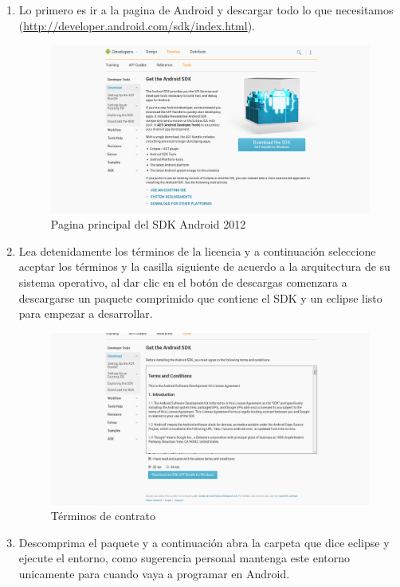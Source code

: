 \documentclass[11pt]{book}
\begin{document}
\begin{enumerate}[1.]

\item Lo primero es ir a la pagina de Android y descargar todo lo que necesitamos (\href{http://developer.android.com/sdk/index.html}{http://developer.android.com/sdk/index.html}).

\begin{figure}[H]
  \centering
    \includegraphics[width=1.0\textwidth]{tutorial_3}
  \caption{Pagina principal del SDK Android 2012}
  \label{fig:tutorial_3}
\end{figure}
\newpage
\item Lea detenidamente los términos de la licencia y a continuación seleccione aceptar los términos y la casilla siguiente de acuerdo a la arquitectura de su sistema operativo, al dar clic en el botón de descargas comenzara a descargarse un paquete comprimido que contiene el SDK y un eclipse listo para empezar a desarrollar.

\begin{figure}[H]
  \centering
    \includegraphics[width=1.0\textwidth]{tutorial_4}
  \caption{Términos de contrato}
  \label{fig:tutorial_4}
\end{figure}
\newpage
\item Descomprima el paquete y a continuación abra la carpeta que dice eclipse y ejecute el entorno, como sugerencia personal mantenga este entorno unicamente para cuando vaya a programar en Android.


\end{enumerate}
\end{document}
